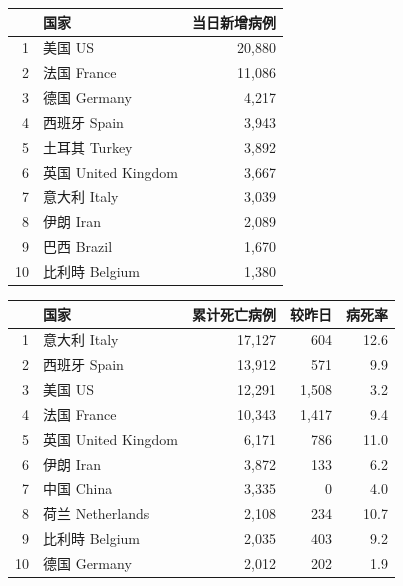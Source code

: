 \documentclass[
]{article}
\begin{document}
\begin{table}

    \begin{minipage}{.45\linewidth}
    \centering
    \captionsetup{justification=centering}
    \caption{日新增病例前十位国家 ）}
    \vspace{-0.5\baselineskip}
      \centering
    \captionsetup{justification=centering} \begin{table}[H]
\centering
\begin{tabular}{rlr}
\toprule
  & 国家 & 当日新增病例\\
\midrule
\rowcolor{gray!6}  1 & 美国 US & 20,880\\
2 & 法国 France & 11,086\\
\rowcolor{gray!6}  3 & 德国 Germany & 4,217\\
4 & 西班牙 Spain & 3,943\\
\rowcolor{gray!6}  5 & 土耳其 Turkey & 3,892\\
6 & 英国 United Kingdom & 3,667\\
\rowcolor{gray!6}  7 & 意大利 Italy & 3,039\\
8 & 伊朗 Iran & 2,089\\
\rowcolor{gray!6}  9 & 巴西 Brazil & 1,670\\
10 & 比利時 Belgium & 1,380\\
\bottomrule
\end{tabular}
\end{table} \end{minipage}%
    \begin{minipage}{.45\linewidth}
    \centering
    \captionsetup{justification=centering}
     \caption{累计死亡病例前十位国家}
     \vspace{-0.5\baselineskip}
      \centering
    \captionsetup{justification=centering} \begin{table}[H]
\centering
\begin{tabular}{rlrrr}
\toprule
  & 国家 & 累计死亡病例 & 较昨日 & 病死率\\
\midrule
\rowcolor{gray!6}  1 & 意大利 Italy & 17,127 & 604 & 12.6\\
2 & 西班牙 Spain & 13,912 & 571 & 9.9\\
\rowcolor{gray!6}  3 & 美国 US & 12,291 & 1,508 & 3.2\\
4 & 法国 France & 10,343 & 1,417 & 9.4\\
\rowcolor{gray!6}  5 & 英国 United Kingdom & 6,171 & 786 & 11.0\\
6 & 伊朗 Iran & 3,872 & 133 & 6.2\\
\rowcolor{gray!6}  7 & 中国 China & 3,335 & 0 & 4.0\\
8 & 荷兰 Netherlands & 2,108 & 234 & 10.7\\
\rowcolor{gray!6}  9 & 比利時 Belgium & 2,035 & 403 & 9.2\\
10 & 德国 Germany & 2,012 & 202 & 1.9\\
\bottomrule
\end{tabular}
\end{table} \end{minipage} 
\end{table}
\end{document}
